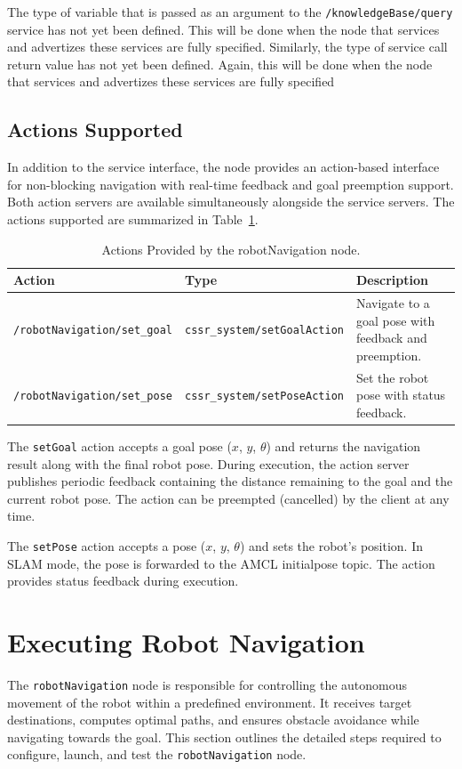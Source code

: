 \documentclass{CSSRforAfrica}
\begin{document}
\noindent The type of variable that is passed as an argument to the \verb|/knowledgeBase/query| service has not yet been defined. This will be done when the node that services and advertizes these services are fully specified. Similarly, the type of service call return value has not yet been defined. Again, this will be done when the node that services and advertizes these services are fully specified

\subsection*{Actions Supported}
In addition to the service interface, the node provides an action-based interface for non-blocking navigation with real-time feedback and goal preemption support. Both action servers are available simultaneously alongside the service servers. The actions supported are summarized in Table~\ref{tab:actions supported}.

\begin{table}[H]
\centering
\caption{Actions Provided by the robotNavigation node.}
\label{tab:actions supported}
\begin{tabularx}{\textwidth}{|l|l|X|}
\hline
\textbf{Action} & \textbf{Type} & \textbf{Description} \\ \hline
\verb|/robotNavigation/set_goal| & \verb|cssr_system/setGoalAction| & Navigate to a goal pose with feedback and preemption. \\ \hline
\verb|/robotNavigation/set_pose| & \verb|cssr_system/setPoseAction| & Set the robot pose with status feedback. \\ \hline
\end{tabularx}
\end{table}

\noindent The \verb|setGoal| action accepts a goal pose ($x$, $y$, $\theta$) and returns the navigation result along with the final robot pose. During execution, the action server publishes periodic feedback containing the distance remaining to the goal and the current robot pose. The action can be preempted (cancelled) by the client at any time.

\noindent The \verb|setPose| action accepts a pose ($x$, $y$, $\theta$) and sets the robot's position. In SLAM mode, the pose is forwarded to the AMCL initialpose topic. The action provides status feedback during execution.

\newpage

\section{Executing Robot Navigation}
The \verb|robotNavigation| node is responsible for controlling the autonomous movement of the robot within a predefined environment. It receives target destinations, computes optimal paths, and ensures obstacle avoidance while navigating towards the goal. This section outlines the detailed steps required to configure, launch, and test the \verb|robotNavigation| node.
\end{document}

